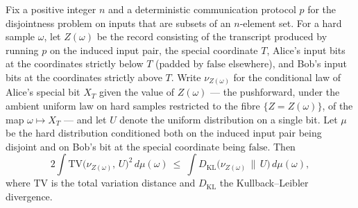\begin{theorem}
\label{CommunicationComplexity.Functions.Disjointness.RandomizedLowerBound.two_mul_integral_xDistance_sq_le_integral_xFiberKL_disjointSpecialYFalse}
\leanok
{}
Fix a positive integer $n$ and a deterministic communication protocol $p$ for the
disjointness problem on inputs that are subsets of an $n$-element set. For a hard sample
$\omega$, let $Z(\omega)$ be the record consisting of the transcript produced by running
$p$ on the induced input pair, the special coordinate $T$, Alice's input bits at the
coordinates strictly below $T$ (padded by $\mathrm{false}$ elsewhere), and Bob's input
bits at the coordinates strictly above $T$. Write $\nu_{Z(\omega)}$ for the conditional
law of Alice's special bit $X_T$ given the value of $Z(\omega)$ — the pushforward, under
the ambient uniform law on hard samples restricted to the fibre $\{Z = Z(\omega)\}$, of
the map $\omega \mapsto X_T$ — and let $U$ denote the uniform distribution on a single
bit. Let $\mu$ be the hard distribution conditioned both on the induced input pair being
disjoint and on Bob's bit at the special coordinate being $\mathrm{false}$. Then
\[
2\int \mathrm{TV}\!\bigl(\nu_{Z(\omega)},\, U\bigr)^{2}\, d\mu(\omega)\ \le\ \int
D_{\mathrm{KL}}\!\bigl(\nu_{Z(\omega)}\,\big\|\,U\bigr)\, d\mu(\omega),
\]
where $\mathrm{TV}$ is the total variation distance and $D_{\mathrm{KL}}$ the
Kullback–Leibler divergence.
\end{theorem}

